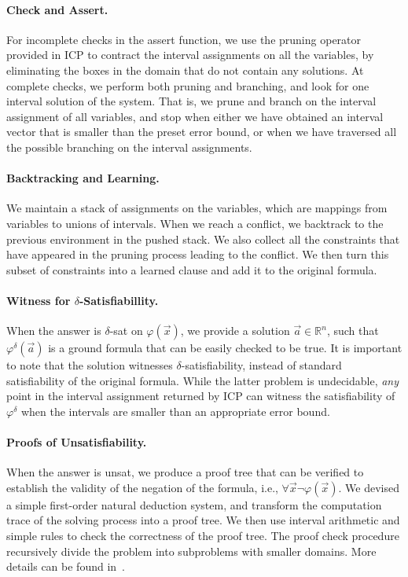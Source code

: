 \documentclass[envcountsect]{llncs}
\begin{document}
\paragraph{Check and Assert.} For incomplete checks in the assert function,
we use the pruning operator provided in ICP to contract the interval assignments
on all the variables, by eliminating the boxes in the domain that do not contain
any solutions. At complete checks, we perform both pruning and branching, and
look for one interval solution of the system. That is, we prune and branch on
the interval assignment of all variables, and stop when either we have obtained
an interval vector that is smaller than the preset error bound, or when we have
traversed all the possible branching on the interval assignments.
\paragraph{Backtracking and Learning.} We maintain a stack of assignments on the variables,
which are mappings from variables to unions of intervals. When we reach a
conflict, we backtrack to the previous environment in the pushed stack. We also collect all the
constraints that have appeared in the pruning process leading to the conflict.
We then turn this subset of constraints into a learned clause and add it to the
original formula.
\paragraph{Witness for $\delta$-Satisfiabillity.} When the answer is {\sf $\delta$-sat} on $\varphi(\vec x)$, we provide a solution $\vec a\in \mathbb{R}^n$, such
that $\varphi^{\delta}(\vec a)$ is a ground formula that can be easily checked
to be true. It is important to note that the
solution witnesses $\delta$-satisfiability, instead of standard satisfiability
of the original formula. While the latter problem is undecidable, {\em any} point in the interval assignment returned by ICP can witness the satisfiability
of $\varphi^{\delta}$ when the intervals are smaller than an appropriate error
bound.
\paragraph{Proofs of Unsatisfiability.} When the answer is {\sf unsat}, we
produce a proof tree that can be verified to establish the validity of the
negation of the formula, i.e., $\forall \vec x \neg\varphi(\vec x)$. We
devised a simple first-order natural deduction system, and transform the
computation trace of the solving process into a proof tree. We then use
interval arithmetic and simple rules to check the correctness of the proof
tree. The proof check procedure recursively divide the problem into subproblems
with smaller domains. More details can be found in~\cite{cade2013extended}.
\end{document}
